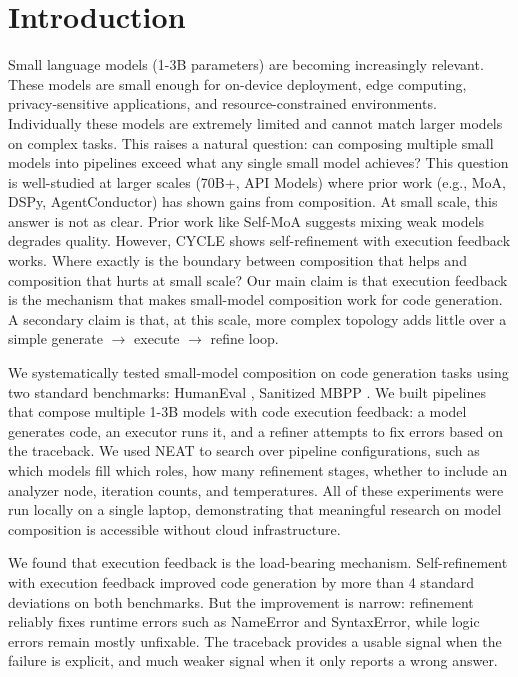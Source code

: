\documentclass{article}
\begin{document}
\section{Introduction}
Small language models (1-3B parameters) are becoming increasingly relevant. These models are small enough for on-device deployment, edge computing, privacy-sensitive applications, and resource-constrained environments. Individually these models are extremely limited and cannot match larger models on complex tasks. This raises a natural question: can composing multiple small models into pipelines exceed what any single small model achieves? This question is well-studied at larger scales (70B+, API Models) where prior work (e.g., MoA, DSPy, AgentConductor) has shown gains from composition. At small scale, this answer is not as clear. Prior work like Self-MoA \cite{selfmoa2025} suggests mixing weak models degrades quality. However, CYCLE \cite{cycle2024} shows self-refinement with execution feedback works. Where exactly is the boundary between composition that helps and composition that hurts at small scale? Our main claim is that execution feedback is the mechanism that makes small-model composition work for code generation. A secondary claim is that, at this scale, more complex topology adds little over a simple generate $\rightarrow$ execute $\rightarrow$ refine loop.

We systematically tested small-model composition on code generation tasks using two standard benchmarks: HumanEval \cite{humaneval2021}, Sanitized MBPP \cite{mbpp2021}. We built pipelines that compose multiple 1-3B models with code execution feedback: a model generates code, an executor runs it, and a refiner attempts to fix errors based on the traceback. We used NEAT \cite{neat2002} to search over pipeline configurations, such as which models fill which roles, how many refinement stages, whether to include an analyzer node, iteration counts, and temperatures. All of these experiments were run locally on a single laptop, demonstrating that meaningful research on model composition is accessible without cloud infrastructure.

We found that execution feedback is the load-bearing mechanism. Self-refinement with execution feedback improved code generation by more than 4 standard deviations on both benchmarks. But the improvement is narrow: refinement reliably fixes runtime errors such as NameError and SyntaxError, while logic errors remain mostly unfixable. The traceback provides a usable signal when the failure is explicit, and much weaker signal when it only reports a wrong answer.
\end{document}
